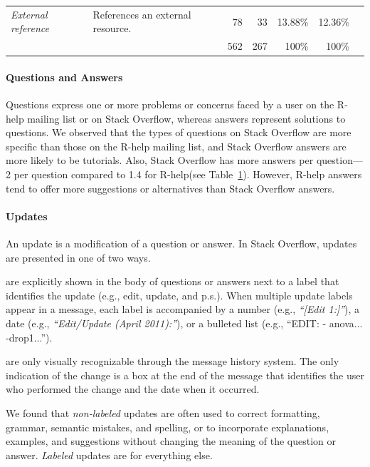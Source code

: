 \documentclass[smallextended]{svjour3}       %
\newcommand{\SO}{Stack Overflow\xspace}
\newcommand{\RH}{R-help\xspace}
\begin{document}
\begin{table}[!htb]
\begin{small}
\begin{tabular}[h]{p{2.3cm}p{10.3cm}rrrrr}
  \emph{External reference}     & References an external resource.                                                                                                                         & 78           & 33               & 13.88\%        & 12.36\%        \\\cline{3-6}
                                &                                                                                                                                                          &{562}  & {267}     & {100\%} & {100\%} \\
  \bottomrule
        \end{tabular}
      \end{small}
      \label{table:type-of-knowledge}
\vspace{-3mm}
    \end{table}

\paragraph{Questions and Answers}
    Questions express one or more problems or concerns faced by a user on the \RH mailing list or on \SO, whereas answers represent solutions to questions.  We observed that the types of questions on \SO are more specific than those on the \RH mailing list, and \SO answers are more likely to be tutorials. Also, \SO has more answers per question---2 per question compared to 1.4 for \RH (see Table~\ref{table:type-of-knowledge}). However, \RH answers tend to offer more suggestions or alternatives than \SO answers. 
\paragraph{Updates}
An update is a modification of a question or answer. In \SO, updates are presented in one of two ways.
\begin{description}[itemsep=3pt, topsep=2pt, leftmargin=1em, parsep=0pt]
\item[\textbf{Labeled updates}] are explicitly shown in the body of questions or answers next to a label that identifies the update (e.g., edit, update, and p.s.).
  When multiple update labels appear in a message, each label is accompanied by a number (e.g., \textit{``[Edit 1:]''}), a date (e.g., \textit{``Edit/Update (April 2011):''}), or a bulleted list
  (e.g., ``EDIT: - anova... -drop1...'').
\item[\textbf{Non-labeled updates}] are only visually recognizable through the message history system. The only indication of the change is a box at the end of the message that identifies the user who performed the change and the date when it occurred.
\end{description}
We found that \textit{non-labeled} updates are often used to correct formatting, grammar, semantic mistakes, and spelling, or to incorporate explanations, examples, and suggestions without changing the meaning of the question or answer. \textit{Labeled} updates are for everything else.
\end{document}
